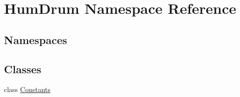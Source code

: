 \hypertarget{namespaceHumDrum}{}\section{Hum\+Drum Namespace Reference}
\label{namespaceHumDrum}
\subsection*{Namespaces}
\begin{DoxyCompactItemize}
\end{DoxyCompactItemize}
\subsection*{Classes}
\begin{DoxyCompactItemize}
\item 
class \hyperlink{classHumDrum_1_1Constants}{Constants}
\end{DoxyCompactItemize}
